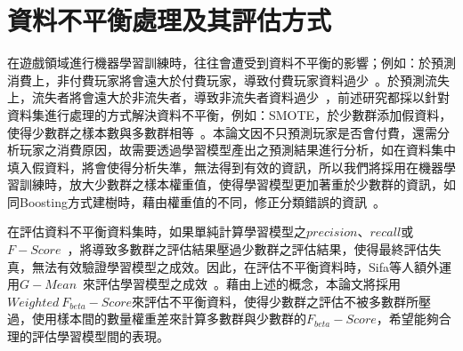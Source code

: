 \section{資料不平衡處理及其評估方式}

在遊戲領域進行機器學習訓練時，往往會遭受到資料不平衡的影響；例如：於預測消費上，非付費玩家將會遠大於付費玩家，導致付費玩家資料過少~\cite{sifa2015predicting}。於預測流失上，流失者將會遠大於非流失者，導致非流失者資料過少~\cite{lee2016predicting}，前述研究都採以針對資料集進行處理的方式解決資料不平衡，例如：SMOTE，於少數群添加假資料，使得少數群之樣本數與多數群相等~\cite{chawla2002smote}。本論文因不只預測玩家是否會付費，還需分析玩家之消費原因，故需要透過學習模型產出之預測結果進行分析，如在資料集中填入假資料，將會使得分析失準，無法得到有效的資訊，所以我們將採用在機器學習訓練時，放大少數群之樣本權重值，使得學習模型更加著重於少數群的資訊，如同Boosting方式建樹時，藉由權重值的不同，修正分類錯誤的資訊~\cite{freund1999short}。

在評估資料不平衡資料集時，如果單純計算學習模型之$precision$、$recall$或$F - Score$~\cite{chinchor1993muc}，將導致多數群之評估結果壓過少數群之評估結果，使得最終評估失真，無法有效驗證學習模型之成效。因此，在評估不平衡資料時，Sifa等人額外運用$G - Mean$~\cite{kubat1997learning}來評估學習模型之成效~\cite{sifa2015predicting}。藉由上述的概念，本論文將採用$Weighted\ F_{beta} - Score$來評估不平衡資料，使得少數群之評估不被多數群所壓過，使用樣本間的數量權重差來計算多數群與少數群的$F_{beta} - Score$，希望能夠合理的評估學習模型間的表現。